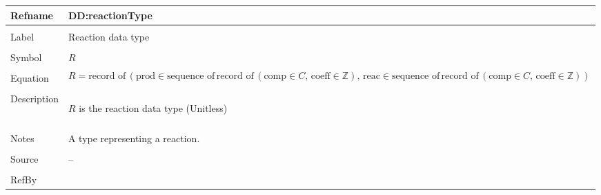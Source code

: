 \documentclass[12pt]{article}
\begin{document}
\begin{minipage}{\textwidth}
\begin{tabular}{>{\raggedright}p{}>{\raggedright\arraybackslash}p{}}
\toprule \textbf{Refname} & \textbf{DD:reactionType}
\label{DD:reactionType}
\\ \midrule \\
Label & Reaction data type
        
\\ \midrule \\
Symbol & $R$
         
\\ \midrule \\
Equation & \begin{displaymath}
           R=\text{record of}\,\left(\text{prod}\in{}\text{sequence of}\,\text{record of}\,\left(\text{comp}\in{}C,\,\text{coeff}\in{}\mathbb{Z}\right),\,\text{reac}\in{}\text{sequence of}\,\text{record of}\,\left(\text{comp}\in{}C,\,\text{coeff}\in{}\mathbb{Z}\right)\right)
           \end{displaymath}
\\ \midrule \\
Description & \begin{symbDescription}
              \item{$R$ is the reaction data type (Unitless)}
              \end{symbDescription}
\\ \midrule \\
Notes & A type representing a reaction.
        
\\ \midrule \\
Source & --
         
\\ \midrule \\
RefBy & 
\\ \bottomrule
\end{tabular}
\end{minipage}
\vspace{\baselineskip}
\noindent
\end{document}
